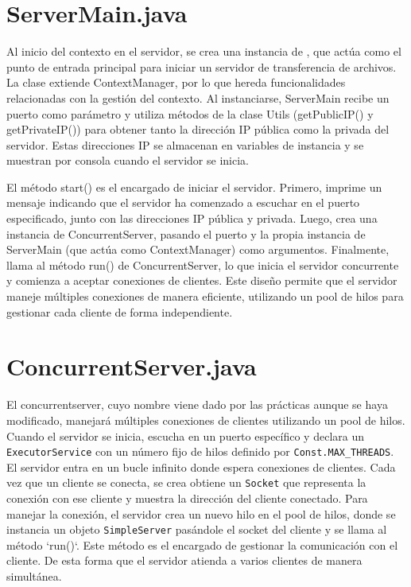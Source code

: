 \documentclass[a4paper, 12pt]{report}
\begin{document}
    \section{ServerMain.java}

    Al inicio del contexto en el servidor, se crea una instancia de , que actúa como el punto de
    entrada principal para iniciar un servidor de transferencia de archivos. La clase extiende ContextManager,
    por lo que hereda funcionalidades relacionadas con la gestión del contexto. Al instanciarse, ServerMain recibe
    un puerto como parámetro y utiliza métodos de la clase Utils (getPublicIP() y getPrivateIP())
    para obtener tanto la dirección IP pública como la privada del
    servidor. Estas direcciones IP se almacenan en variables de instancia y se muestran por consola cuando el servidor se inicia.

    El método start()
    es el encargado de iniciar el servidor. Primero, imprime un mensaje
    indicando que el servidor ha comenzado a escuchar en el puerto
    especificado, junto con las direcciones IP pública y privada. Luego,
    crea una instancia de ConcurrentServer, pasando el puerto y la propia instancia de ServerMain (que actúa como ContextManager) como argumentos. Finalmente, llama al método run() de ConcurrentServer,
    lo que inicia el servidor concurrente y comienza a aceptar conexiones
    de clientes. Este diseño permite que el servidor maneje múltiples
    conexiones de manera eficiente, utilizando un pool de hilos para
    gestionar cada cliente de forma independiente.



    \section{ConcurrentServer.java}

    El concurrentserver, cuyo nombre viene dado por las prácticas aunque se haya modificado, manejará múltiples
    conexiones de clientes utilizando un pool de hilos. Cuando el servidor se inicia, escucha en un puerto
    específico y declara un \texttt{ExecutorService}  con un número fijo de hilos definido por
    \texttt{Const.MAX_THREADS}. El servidor entra en un bucle infinito donde espera conexiones de clientes. Cada
    vez que un cliente se conecta, se crea obtiene un \texttt{Socket} que
    representa la conexión con ese cliente y muestra la dirección del cliente
    conectado. Para manejar la conexión, el servidor crea un nuevo hilo en el pool de hilos, donde se instancia un
    objeto \texttt{SimpleServer} pasándole el socket del cliente y se llama al método `run()`. Este método es el
    encargado de gestionar la comunicación con el cliente. De esta forma que el servidor atienda a varios
    clientes de manera simultánea.
\end{document}
